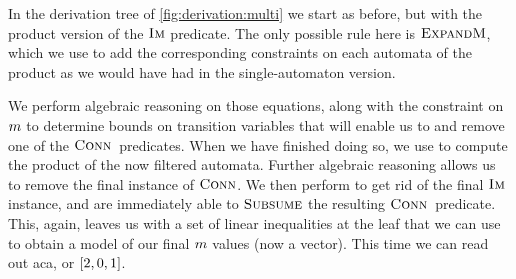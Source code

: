 In the derivation tree of \cref{fig:derivation:multi} we start as before, but
with the product version of the $\operatorname{\textsc{Im}}$ predicate. The only possible rule here
is $\textsc{ExpandM}$, which we use to add the corresponding constraints on each
automata of the product as we would have had in the single-automaton version. 

We perform algebraic reasoning on those equations, along with the constraint on
$m$ to determine bounds on transition variables that will enable us
to \Subsume{} and remove one of the $\operatorname{\textsc{Conn}}{}$ predicates. When we have
finished doing so, we use \Materialise{} to compute the product of the now
filtered automata. Further algebraic reasoning allows us to remove the final
instance of $\operatorname{\textsc{Conn}}$. We then perform \Expand{} to get rid of the final
$\operatorname{\textsc{Im}}$ instance, and are immediately able to $\textsc{Subsume}$ the resulting
$\operatorname{\textsc{Conn}}{}$ predicate. This, again, leaves us with a set of linear
inequalities at the leaf that we can use to obtain a model of our final
$m$ values (now a vector). This time we can read out aca, or
$\left[{2, 0, 1}\right]$.


